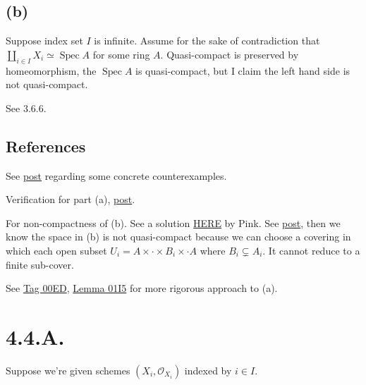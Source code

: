 \subsection{(b)}

Suppose index set $I$ is infinite. Assume for the sake of contradiction that $\amalg_{i\in I}X_i\simeq \operatorname{Spec}A$ for some ring $A$. Quasi-compact is preserved by homeomorphism, the $\operatorname{Spec}A$ is quasi-compact, but I claim the left hand side is not quasi-compact. 

See 3.6.6.

\subsection{References}

See \href{https://math.stackexchange.com/questions/778440/spectrum-of-a-product-of-rings-isomorphic-to-the-product-of-the-spectra}{post} regarding some concrete counterexamples.

Verification for part (a), \href{https://math.stackexchange.com/questions/321018/why-is-the-disjoint-union-of-a-finite-number-of-affine-schemes-an-affine-scheme#:~:text=We%20know%20that%20the%20disjoint,space%20is%20not%20quasi%2Dcompact.}{post}.

For non-compactness of (b). See a solution \href{https://metaphor.ethz.ch/x/2017/fs/401-3146-12L/ex/SolSheet6.pdf}{HERE} by Pink. See \href{https://math.stackexchange.com/questions/3038162/proving-mathbbn-is-not-compact}{post}, then we know the space in (b) is not quasi-compact because we can choose a covering in which each open subset $U_i=A\times\cdot\times B_i\times \cdot A$ where $B_i\subsetneq A_i$. It cannot reduce to a finite sub-cover.

See \href{https://stacks.math.columbia.edu/tag/00ED}{Tag 00ED}, \href{https://stacks.math.columbia.edu/tag/01I5}{Lemma 01I5} for more rigorous approach to (a).


\section{4.4.A.}

Suppose we're given schemes $(X_i,\mathcal O_{X_i})$ indexed by $i\in I$. 